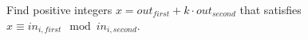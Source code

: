 Find positive integers $x=out_{first}+k\cdot out_{second}$ that satisfies $x\equiv in_{i,first}\mod in_{i,second}$.



